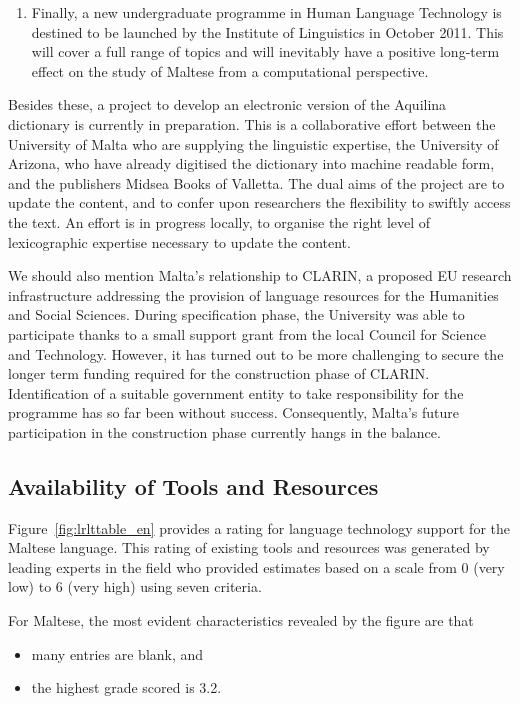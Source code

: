 \begin{multicols}{2}
\begin{enumerate}
\item Finally, a new undergraduate programme in Human Language Technology is destined to be launched by the Institute of Linguistics in October 2011. This will cover a full range of topics and will inevitably have a positive long-term effect on the study of Maltese from a computational perspective.
\end{enumerate}

Besides these, a project to develop an electronic version of the Aquilina dictionary \cite{Aquilina:1987,Aquilina:1990} is currently in preparation. This is a collaborative effort between the University of Malta who are supplying the linguistic expertise, the University of Arizona, who have already digitised the dictionary into machine readable form, and the publishers Midsea Books of Valletta. The dual aims of the project are to update the content, and to confer upon researchers the flexibility to swiftly access the text. An effort is in progress locally, to organise the right level of lexicographic expertise necessary to update the content.

We should also mention Malta’s relationship to CLARIN, a proposed EU research infrastructure addressing the provision of language resources for the Humanities and Social Sciences. During specification phase, the University was able to participate thanks to a small support grant from the local Council for Science and Technology. However, it has turned out to be more challenging to secure the longer term funding required for the construction phase of CLARIN. Identification of a suitable government entity to take responsibility for the programme has so far been without success. Consequently, Malta’s future participation in the construction phase currently hangs in the balance.
  
\subsection{Availability of Tools and Resources}

Figure~\ref{fig:lrlttable_en} provides a rating for language technology support for the Maltese language. This rating of existing tools and resources was generated by leading experts in the field who provided estimates based on a scale from 0 (very low) to 6 (very high) using seven criteria. 

For Maltese, the most evident characteristics revealed by the figure are that

\begin{itemize}
\item many entries are blank, and
\item the highest grade scored is 3.2.
\end{itemize}


\end{multicols}
